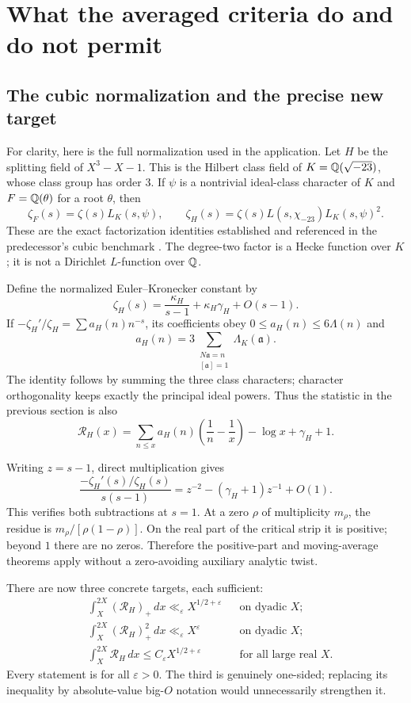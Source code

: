 \section{What the averaged criteria do and do not permit}

\subsection{The cubic normalization and the precise new target}

For clarity, here is the full normalization used in the application.
Let $H$ be the splitting field of $X^3-X-1$. This is the Hilbert
class field of $K=\mathbb Q(\sqrt{-23})$, whose class group has order $3$.
If $\psi$ is a nontrivial ideal-class character of $K$ and
$F=\mathbb Q(\theta)$ for a root $\theta$, then
\[
 \zeta_F(s)=\zeta(s)L_K(s,\psi),\qquad
 \zeta_H(s)=\zeta(s)L(s,\chi_{-23})L_K(s,\psi)^2.
\]
These are the exact factorization identities established and referenced
in the predecessor's cubic benchmark \cite{priorcubic}.
The degree-two factor is a Hecke function over $K$; it is not a
Dirichlet $L$-function over $\mathbb Q$.

Define the normalized Euler--Kronecker constant by
\[
 \zeta_H(s)=\frac{\kappa_H}{s-1}
              +\kappa_H\gamma_H+O(s-1).
\]
If $-\zeta_H'/\zeta_H=\sum a_H(n)n^{-s}$, its coefficients obey
$0\le a_H(n)\le6\Lambda(n)$ and
\[
 a_H(n)=3\!\!\sum_{\substack{N\mathfrak a=n\\{}[\mathfrak a]=1}}
                 \Lambda_K(\mathfrak a).
\]
The identity follows by summing the three class characters; character
orthogonality keeps exactly the principal ideal powers. Thus the
statistic in the previous section is also
\[
 \mathcal R_H(x)=
 \sum_{n\le x}a_H(n)\left(\frac1n-\frac1x\right)
       -\log x+\gamma_H+1.
\]

Writing $z=s-1$, direct multiplication gives
\[
 \frac{-\zeta_H'(s)/\zeta_H(s)}{s(s-1)}
   =z^{-2}-(\gamma_H+1)z^{-1}+O(1).
\]
This verifies both subtractions at $s=1$.
At a zero $\rho$ of multiplicity $m_\rho$, the residue is
$m_\rho/[\rho(1-\rho)]$. On the real part of the critical strip it
is positive; beyond $1$ there are no zeros. Therefore the
positive-part and moving-average theorems apply without a
zero-avoiding auxiliary analytic twist.

There are now three concrete targets, each sufficient:
\[
\boxed{\begin{aligned}
 &\int_X^{2X}(\mathcal R_H)_+\,dx
        \ll_\varepsilon X^{1/2+\varepsilon}
        &&\text{on dyadic }X;\\
 &\int_X^{2X}(\mathcal R_H)_+^2\,dx
        \ll_\varepsilon X^\varepsilon
        &&\text{on dyadic }X;\\
 &\int_X^{2X}\mathcal R_H\,dx
        \le C_\varepsilon X^{1/2+\varepsilon}
        &&\text{for all large real }X.
\end{aligned}}
\]
Every statement is for all $\varepsilon>0$. The third is genuinely
one-sided; replacing its inequality by absolute-value big-$O$
notation would unnecessarily strengthen it.

